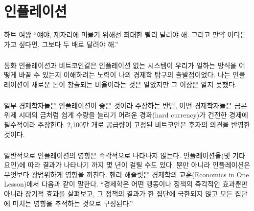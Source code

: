 \chapter{인플레이션}
\label{les:9}

\begin{chapquote}{하트 여왕} 
	\enquote{얘야, 제자리에 머물기 위해선 최대한 빨리 달려야 해. 그리고 만약 어디든 가고 싶다면, 그보다 두 배로 달려야 해.}
\end{chapquote}

\paragraph{}
통화 인플레이션과 비트코인같은 인플레이션 없는 시스템이 
우리가 일하는 방식을 어떻게 바꿀 수 있는지 이해하려는 노력이 나의 경제학 탐구의 출발점이었다. 
나는 인플레이션이 새로운 돈이 창출되는 비율이라는 것은 알았지만 그 이상은 알지 못했다.

\paragraph{}
일부 경제학자들은 인플레이션이 좋은 것이라 주장하는 반면, 어떤 경제학자들은 금본위제 시대의 금처럼 
쉽게 수량을 늘리기 어려운 경화(hard currency)가 건전한 경제에 필수적이라 주장한다. 
2,100만 개로 공급량이 고정된 비트코인은 후자의 의견을 반영한 것이다.

\paragraph{}
일반적으로 인플레이션의 영향은 즉각적으로 나타나지 않는다. 
인플레이션율(및 기타 요인)에 따라 결과가 나타나기 까지 몇 년이 걸릴 수도 있다. 
뿐만 아니라 인플레이션은 무엇보다 광범위하게 영향을 끼친다. 
헨리 해즐릿은 경제학의 교훈(Economics in One Lesson)에서 다음과 같이 말한다. 
\enquote{경제학은 어떤 행동이나 정책의 즉각적인 효과뿐만 아니라 장기적 효과를 살펴보고, 
	그 정책의 결과가 한 집단에 국한되지 않고 모든 집단에 미치는 영향을 추적하는 것으로 구성된다.}


